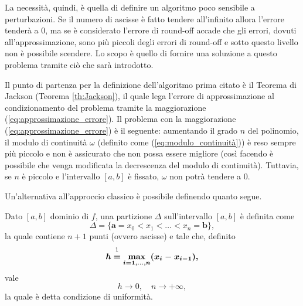 La necessità, quindi, è quella di definire un algoritmo poco sensibile a perturbazioni. Se il numero di ascisse è fatto tendere all'infinito allora l'errore tenderà a 0, ma se è considerato l'errore di round-off accade che gli errori, dovuti all'approssimazione, sono più piccoli degli errori di round-off e sotto questo livello non è possibile scendere. Lo scopo è quello di fornire una soluzione a questo problema tramite ciò che sarà introdotto.

Il punto di partenza per la definizione dell'algoritmo prima citato è il Teorema di Jackson (Teorema \ref{th:Jackson}), il quale lega l'errore di approssimazione al condizionamento del problema tramite la maggiorazione (\ref{eq:approssimazione_errore}). Il problema con la maggiorazione (\ref{eq:approssimazione_errore}) è il seguente: aumentando il grado $n$ del polinomio, il modulo di continuità $\omega$ (definito come (\ref{eq:modulo_continuità})) è reso sempre più piccolo e non è assicurato che non possa essere migliore (così facendo è possibile che venga modificata la decrescenza del modulo di continuità). Tuttavia, se $n$ è piccolo e l'intervallo $[a,b]$ è fissato, $\omega$ non potrà tendere a 0.

Un'alternativa all'approccio classico è possibile definendo quanto segue.

\begin{definition}
    Dato $[a,b]$ dominio di $f$, una partizione $\Delta$ sull'intervallo $[a,b]$ è definita come
    \begin{equation}\label{eq:definizione_partizione}
            \Delta = \{\boldsymbol{a}=x_0<x_1<\hdots<x_n=\boldsymbol{b}\},
    \end{equation}
    la quale contiene $n+1$ punti (ovvero ascisse) e tale che, definito
    \begin{equation}
    	\boldsymbol h\overset{\footnotemark}{\boldsymbol =}\underset{\boldsymbol{i=1,\hdots,n}}{\boldsymbol\max}\boldsymbol{(x_i-x_{i-1}),}
    \end{equation}
    vale
    \begin{equation}\label{eq:condizione_uniformita_partizione}
    	h\rightarrow 0, \quad n\rightarrow +\infty,
    \end{equation}
    la quale è detta condizione di uniformità.
\end{definition}


